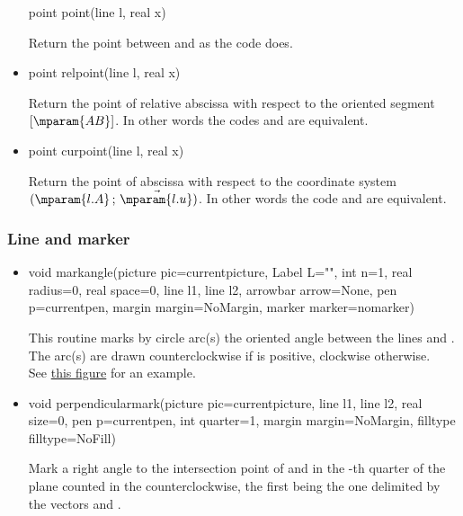 \documentclass[pdftex]{article}
\begin{document}
\begin{itemize}
  \begin{Vcolor}
    point point(line l, real x)
  \end{Vcolor}
  Return the point between  and  as the code
   does.
\item {}%
  \begin{Vcolor}
    point relpoint(line l, real x)
  \end{Vcolor}
  Return the point of relative abscissa  with respect to the
  oriented segment $[\mparam{AB}]$. In other words the
  codes  and  are
  equivalent.
\item {}%
  \begin{Vcolor}
    point curpoint(line l, real x)
  \end{Vcolor}
  Return the point of abscissa  with respect to the
  coordinate system  $(\mparam{l.A}\,;\,\vec{\mparam{l.u}})$.
  In other words the code  and
   are equivalent.
\end{itemize}


\subsubsection{Line and marker}
\begin{itemize}
\item {}%
  \begin{Vcolor}
    void markangle(picture pic=currentpicture,
    Label L="", int n=1, real radius=0, real space=0,
    line l1, line l2,
    arrowbar arrow=None, pen p=currentpen,
    margin margin=NoMargin, marker marker=nomarker)
  \end{Vcolor}
  This routine marks  by   circle arc(s) the oriented angle
  between the lines  and . The arc(s) are drawn
  counterclockwise if  is positive, clockwise otherwise.\\
  See \href{#bisectorline}{this figure} for an example.
\item {}%
  \begin{Vcolor}
    void perpendicularmark(picture pic=currentpicture, line l1, line l2,
    real size=0, pen p=currentpen, int quarter=1,
    margin margin=NoMargin, filltype filltype=NoFill)
  \end{Vcolor}
  Mark a right angle to the intersection point of 
  and  in the -th quarter of the plane
  counted in the counterclockwise, the first being the one delimited
  by the vectors  and .
\end{itemize}
\end{document}
